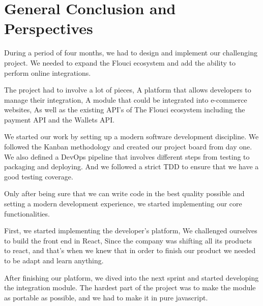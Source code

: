 \chapter{General Conclusion and Perspectives }
\pagestyle{fancy}
\fancyhf{}
\fancyhead[R]{\bfseries\rightmark}
\fancyfoot[R]{\thepage}
\renewcommand{\headrulewidth}{0.5pt}
\renewcommand{\footrulewidth}{0pt}
\renewcommand{\chaptermark}[1]{\markboth{\MakeUppercase{\chaptername~\thechapter. #1 }}{}}
\renewcommand{\sectionmark}[1]{\markright{\thechapter.\thesection~ #1}}

\begin{spacing}{1.2}
During a period of four months, we had to design and implement our challenging project. We needed to expand the Flouci ecosystem and add the ability to perform online integrations.
\newline

The project had to involve a lot of pieces, A platform that allows developers to manage their integration, A module that could be integrated into e-commerce websites, As well as the existing API's of The Flouci ecosystem including the payment API and the Wallets API.   
\newline

We started our work by setting up a modern software development discipline. We followed the Kanban methodology and created our project board from day one. We also defined a DevOps pipeline that involves different steps from testing to packaging and deploying. And we followed a strict TDD to ensure that we have a good testing coverage. 
\newline

Only after being sure that we can write code in the best quality possible and setting a modern development experience, we started implementing our core functionalities. 

First, we started implementing the developer's platform, We challenged ourselves to build the front end in React, Since the company was shifting all its products to react, and that's when we knew that in order to finish our product we needed to be adapt and learn anything.

After finishing our platform, we dived into the next sprint and started developing the integration module. The hardest part of the project was to make the module as portable as possible, and we had to make it in pure javascript.  


\end{spacing}

